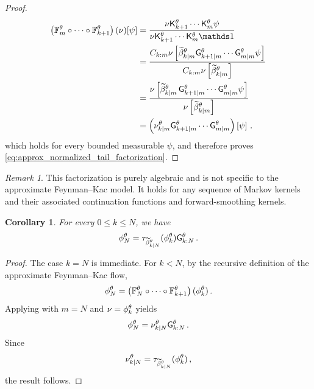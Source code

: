 \documentclass[11pt]{article}
\theoremstyle{plain}
\newtheorem{corollary}[theorem]{Corollary}
\theoremstyle{definition}
\theoremstyle{remark}
\newtheorem{remark}[theorem]{Remark}
\begin{document}
\begin{proof}
\begin{align*}
\left( \filtertransform{m}*[\theta] \circ \cdots \circ \filtertransform{k+1}*[\theta] \right)(\nu)[\psi]
& = \frac{ \nu \unpredictive{k+1}[\theta]\cdots\unpredictive{m}[\theta]\psi  }{ \nu \unpredictive{k+1}[\theta]\cdots\unpredictive{m}[\theta]\un  } \\
&= \frac{ C_{k:m} \nu\left[ \normbackwardfun{k}{m}[\theta] \fsmk{k+1}{m}[\theta]\cdots\fsmk{m}{m}[\theta]\psi \right] }{ C_{k:m} \nu\left[ \normbackwardfun{k}{m}[\theta] \right] } \\
&= \frac{ \nu\left[ \normbackwardfun{k}{m}[\theta]\, \fsmk{k+1}{m}[\theta]\cdots\fsmk{m}{m}[\theta]\psi \right] }{ \nu\left[ \normbackwardfun{k}{m}[\theta] \right] }\\
& = \left( \backwardnu{k}{m}[\theta] \fsmk{k+1}{m}[\theta]\cdots\fsmk{m}{m}[\theta] \right) \left[\psi \right] \eqsp.
\end{align*}
which holds for every bounded measurable $\psi$, and therefore proves \eqref{eq:approx_normalized_tail_factorization}.
\end{proof}

\begin{remark}
This factorization is purely algebraic and is not specific to the approximate Feynman--Kac model. It holds for any sequence of Markov kernels and their associated continuation functions and forward-smoothing kernels.
\end{remark}

\begin{corollary}
\label{lem:terminal_forward_smoothing_decomposition}
For every $0\le k\le N$, we have
\begin{equation}
\label{eq:terminal_forward_smoothing_decomposition_app}
\approxfilter{N}
=
\tau_{\normbackwardfun{k}{N}[\theta]} (\approxfilter{k}) \prodfsmk{k}{N}[\theta] \eqsp.
\end{equation}

\end{corollary}

\begin{proof}
The case $k=N$ is immediate. For $k<N$, by the recursive definition
of the approximate Feynman--Kac flow,
$$
\approxfilter{N} = \left( \filtertransform{N}[\theta] \circ\cdots\circ \filtertransform{k+1}[\theta] \right) (\approxfilter{k}) \eqsp.
$$
Applying  with
$m=N$ and $\nu=\approxfilter{k}$ yields
$$
\approxfilter{N} = \backwardnu{k}{N}[\theta] \prodfsmk{k}{N}[\theta] \eqsp.
$$
Since
$$
\backwardnu{k}{N}[\theta] = \tau_{\normbackwardfun{k}{N}[\theta]} (\approxfilter{k}) \eqsp,
$$
the result follows.
\end{proof}
\end{document}
